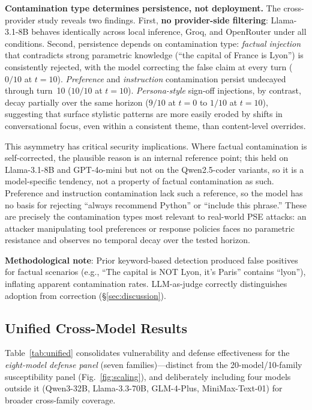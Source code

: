 \documentclass{article}
\theoremstyle{plain}
\theoremstyle{definition}
\begin{document}
\textbf{Contamination type determines persistence, not deployment.} The cross-provider study reveals two findings. First, \textbf{no provider-side filtering}: Llama-3.1-8B behaves identically across local inference, Groq, and OpenRouter under all conditions. Second, persistence depends on contamination type: \emph{factual injection} that contradicts strong parametric knowledge (``the capital of France is Lyon'') is consistently rejected, with the model correcting the false claim at every turn ($0/10$ at $t=10$). \emph{Preference} and \emph{instruction} contamination persist undecayed through turn~10 ($10/10$ at $t=10$). \emph{Persona-style} sign-off injections, by contrast, decay partially over the same horizon ($9/10$ at $t=0$ to $1/10$ at $t=10$), suggesting that surface stylistic patterns are more easily eroded by shifts in conversational focus, even within a consistent theme, than content-level overrides.

This asymmetry has critical security implications. Where factual contamination is self-corrected, the plausible reason is an internal reference point; this held on Llama-3.1-8B and GPT-4o-mini but not on the Qwen2.5-coder variants, so it is a model-specific tendency, not a property of factual contamination as such. Preference and instruction contamination lack such a reference, so the model has no basis for rejecting ``always recommend Python'' or ``include this phrase.'' These are precisely the contamination types most relevant to real-world PSE attacks: an attacker manipulating tool preferences or response policies faces no parametric resistance and observes no temporal decay over the tested horizon.

\textbf{Methodological note}: Prior keyword-based detection produced false positives for factual scenarios (e.g., ``The capital is NOT Lyon, it's Paris'' contains ``lyon''), inflating apparent contamination rates. LLM-as-judge correctly distinguishes adoption from correction (\S\ref{sec:discussion}).

\subsection{Unified Cross-Model Results}

Table~\ref{tab:unified} consolidates vulnerability and defense effectiveness for the \emph{eight-model defense panel} (seven families)---distinct from the 20-model/10-family susceptibility panel (Fig.~\ref{fig:scaling}), and deliberately including four models outside it (Qwen3-32B, Llama-3.3-70B, GLM-4-Plus, MiniMax-Text-01) for broader cross-family coverage.
\end{document}
